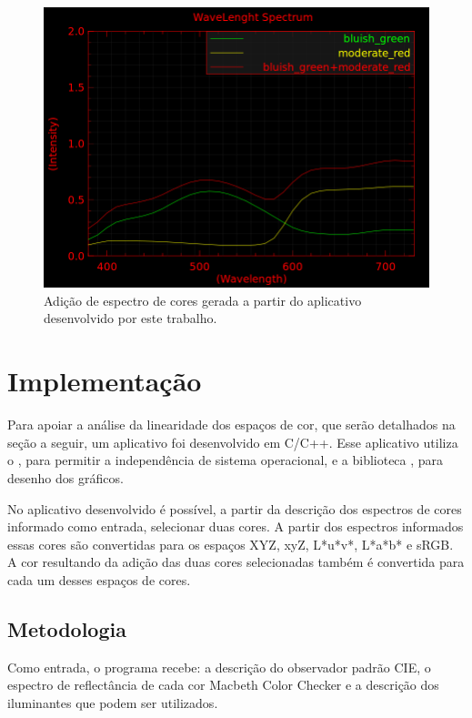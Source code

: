 \begin{figure}[!htb]
     \centering
     \includegraphics[scale=0.6]{img/color_addition.png}
     \caption{Adição de espectro de cores gerada a partir do aplicativo
desenvolvido por este trabalho.}
     \label{fig:color_addition}
\end{figure}

\section{Implementação}
Para apoiar a análise da linearidade dos espaços de cor, que serão detalhados
na seção a seguir, um aplicativo foi desenvolvido em C/C++. Esse aplicativo
utiliza o , para permitir a
independência de
sistema operacional, e a biblioteca
, para desenho dos
gráficos.

\par
No aplicativo desenvolvido é possível, a partir da descrição dos espectros de
cores informado como entrada, selecionar duas cores. A partir dos espectros
informados essas cores são convertidas para os espaços XYZ, xyZ, L*u*v*,
L*a*b* e sRGB. A cor resultando da adição das duas cores selecionadas também é
convertida para cada um desses espaços de cores.

\subsection{Metodologia}
\par
Como entrada, o programa recebe: a descrição do observador padrão CIE, o
espectro de reflectância de cada cor Macbeth Color Checker e a
descrição dos iluminantes que podem ser utilizados.

